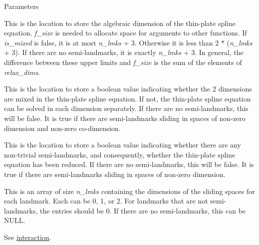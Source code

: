 \begin{DoxyParams}{Parameters}
\item[\mbox{\tt[out]} {\em f\_\-size}]This is the location to store the algebraic dimension of the thin-\/plate spline equation. {\itshape f\_\-size\/} is needed to allocate space for arguments to other functions. If {\itshape is\_\-mixed\/} is {\ttfamily false}, it is at most {\itshape n\_\-lmks\/} + 3. Otherwise it is less than 2 $\ast$ ({\itshape n\_\-lmks\/} + 3). If there are no semi-\/landmarks, it is exactly {\itshape n\_\-lmks\/} + 3. In general, the difference between these upper limits and {\itshape f\_\-size\/} is the sum of the elements of {\itshape relax\_\-dims\/}. \item[\mbox{\tt[out]} {\em is\_\-mixed}]This is the location to store a {\ttfamily boolean} value indicating whether the 2 dimensions are mixed in the thin-\/plate spline equation. If not, the thin-\/plate spline equation can be solved in each dimension separately. If there are no semi-\/landmarks, this will be {\ttfamily false}. It is {\ttfamily true} if there are semi-\/landmarks sliding in spaces of non-\/zero dimension and non-\/zero co-\/dimension. \item[\mbox{\tt[out]} {\em is\_\-reduced}]This is the location to store a {\ttfamily boolean} value indicating whether there are any non-\/trivial semi-\/landmarks, and consequently, whether the thin-\/plate spline equation has been reduced. If there are no semi-\/landmarks, this will be {\ttfamily false}. It is {\ttfamily true} if there are semi-\/landmarks sliding in spaces of non-\/zero dimension. \item[\mbox{\tt[in]} {\em relax\_\-dims\_\-opt}]This is an array of size {\itshape n\_\-lmks\/} containing the dimensions of the sliding spaces for each landmark. Each can be 0, 1, or 2. For landmarks that are not semi-\/landmarks, the entries should be 0. If there are no semi-\/landmarks, this can be {\ttfamily NULL}. \item[\mbox{\tt[in]} {\em n\_\-lmks}]See \hyperlink{classew_1_1Tps2_a7f04e98fa574f821257e904658b2bb8b}{interaction}. \end{DoxyParams}
